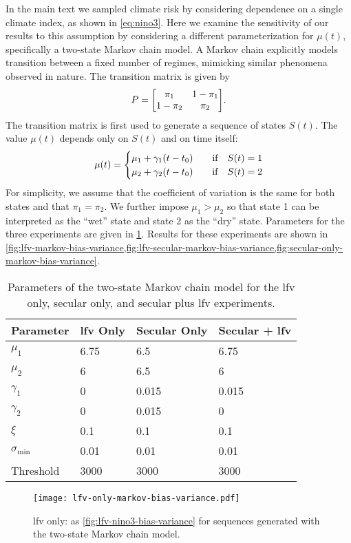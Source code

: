 \documentclass[
  draft,
  linenumbers
]{agujournal2018}
\begin{document}
In the main text we sampled climate risk by considering dependence on a single climate index, as shown in \cref{eq:nino3}.
Here we examine the sensitivity of our results to this assumption by considering a different parameterization for $\mu(t)$, specifically a two-state Markov chain model.
A Markov chain explicitly models transition between a fixed number of regimes, mimicking similar phenomena observed in nature.
The transition matrix is given by
\begin{equation}
  P = \mqty[\pi_1 & 1-\pi_1 \\ 1-\pi_2 & \pi_2].
\end{equation}
The transition matrix is first used to generate a sequence of states $S(t)$.
The value $\mu(t)$ depends only on $S(t)$ and on time itself:
\begin{equation}
  \mu(t) = \begin{cases}
    \mu_{1} + \gamma_1 \qty(t - t_0) & \qqtext{if} S(t) = 1 \\
    \mu_{2} + \gamma_2 \qty(t - t_0) & \qqtext{if} S(t) = 2
  \end{cases}
\end{equation}
For simplicity, we assume that the coefficient of variation is the same for both states and that $\pi_1=\pi_2$.
We further impose $\mu_{1} > \mu_{2}$ so that state 1 can be interpreted as the ``wet'' state and state 2 as the ``dry'' state.
Parameters for the three experiments are given in \cref{tab:markov-stationary}.
Results for these experiments are shown in \cref{fig:lfv-markov-bias-variance,fig:lfv-secular-markov-bias-variance,fig:secular-only-markov-bias-variance}.
\begin{table}[ht]
  \centering
  \begin{tabular}{llll}
    \toprule
    Parameter & \gls{lfv} Only & Secular Only & Secular + \gls{lfv} \\
    \midrule
    $\mu_1$             & 6.75  & 6.5   & 6.75\\
    $\mu_2$             & 6     & 6.5   & 6\\
    $\gamma_1$          & 0     & 0.015 & 0.015\\
    $\gamma_2$          & 0     & 0.015 & 0\\
    $\xi$               & 0.1   & 0.1   & 0.1\\
    $\sigma_\text{min}$ & 0.01  & 0.01  & 0.01\\
    Threshold           & 3000  & 3000  & 3000 \\
    \bottomrule
  \end{tabular}
  \caption{
    Parameters of the two-state Markov chain model for the \gls{lfv} only, secular only, and secular plus \gls{lfv} experiments.
  }\label{tab:markov-stationary}
\end{table}
\begin{figure}
  \centering
  \texttt{[image: lfv-only-markov-bias-variance.pdf]}
  \caption{
    \Gls{lfv} only: as \cref{fig:lfv-nino3-bias-variance} for sequences generated with the two-state Markov chain model.
  }\label{fig:lfv-markov-bias-variance}
\end{figure}
\end{document}
